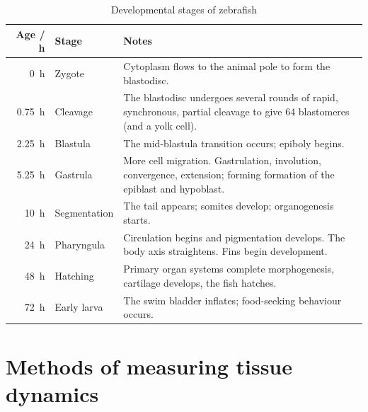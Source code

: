 \begin{table}
 \centering
 \begin{tabular*}{\textwidth}{rlp{23em}}
 \toprule
 Age / \SI{}{\hour} & Stage & Notes \\
 \midrule
 \SI{0}{\hour} & Zygote & Cytoplasm flows to the animal pole to form the blastodisc.\\
 \SI{0.75}{\hour} & Cleavage & The blastodisc undergoes several rounds of rapid, synchronous, partial cleavage to give 64 blastomeres (and a yolk cell).\\
 \SI{2.25}{\hour} & Blastula & The mid-blastula transition occurs; epiboly begins.\\
 \SI{5.25}{\hour} & Gastrula & More cell migration. Gastrulation, involution, convergence, extension; forming formation of the epiblast and hypoblast.\\
 \SI{10}{\hour} & Segmentation & The tail appears; somites develop; organogenesis starts. \\
 \SI{24}{\hour} & Pharyngula & Circulation begins and pigmentation develops. The body axis straightens. Fins begin development.\\
 \SI{48}{\hour} & Hatching & Primary organ systems complete morphogenesis, cartilage develops, the fish hatches.\\
 \SI{72}{\hour} & Early larva & The swim bladder inflates; food-seeking behaviour occurs. \\
  \bottomrule
 \end{tabular*}
 \caption{Developmental stages of \gls{zebrafish}}\label{tab:zfish_dev}
\end{table}

\section{Methods of measuring tissue dynamics}

